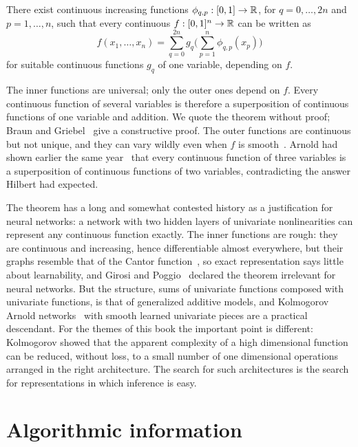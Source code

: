 \begin{theorem}
There exist continuous increasing functions $\phi_{q,p}:[0,1]\to\mathbb{R}$, for $q = 0,\dots,2n$ and $p = 1,\dots,n$, such that every continuous $f:[0,1]^n\to\mathbb{R}$ can be written as
\[
f(x_1,\dots,x_n) = \sum_{q=0}^{2n}g_q\Big(\sum_{p=1}^n\phi_{q,p}(x_p)\Big)
\]
for suitable continuous functions $g_q$ of one variable, depending on $f$.
\end{theorem}

The inner functions are universal; only the outer ones depend on $f$. Every continuous function of several variables is therefore a superposition of continuous functions of one variable and addition. We quote the theorem without proof; Braun and Griebel~\cite{braungriebel2009} give a constructive proof. The outer functions are continuous but not unique, and they can vary wildly even when $f$ is smooth~\cite{schmidthieber2021}. Arnold had shown earlier the same year~\cite{arnold1957} that every continuous function of three variables is a superposition of continuous functions of two variables, contradicting the answer Hilbert had expected.

The theorem has a long and somewhat contested history as a justification for neural networks: a network with two hidden layers of univariate nonlinearities can represent any continuous function exactly. The inner functions are rough: they are continuous and increasing, hence differentiable almost everywhere, but their graphs resemble that of the Cantor function~\cite{schmidthieber2021}, so exact representation says little about learnability, and Girosi and Poggio~\cite{girosipoggio1989} declared the theorem irrelevant for neural networks. But the structure, sums of univariate functions composed with univariate functions, is that of generalized additive models, and Kolmogorov Arnold networks~\cite{liu2024kan} with smooth learned univariate pieces are a practical descendant. For the themes of this book the important point is different: Kolmogorov showed that the apparent complexity of a high dimensional function can be reduced, without loss, to a small number of one dimensional operations arranged in the right architecture. The search for such architectures is the search for representations in which inference is easy.

\section{Algorithmic information}


